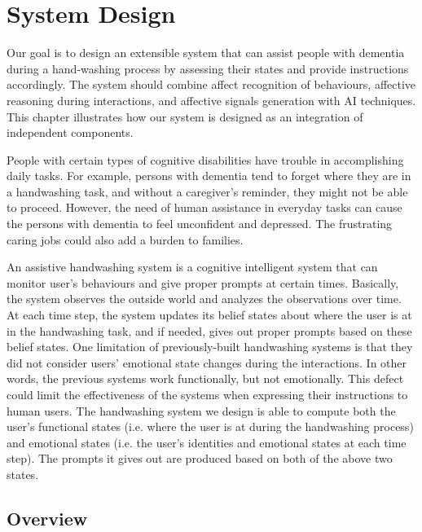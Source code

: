 \chapter{System Design}
\label{chap:design}

Our goal is to design an extensible system that can assist people with dementia during a hand-washing process by assessing their states and provide instructions accordingly. The system should combine affect recognition of behaviours, affective reasoning during interactions, and affective signals generation with AI techniques. This chapter illustrates how our system is designed as an integration of independent components. 

People with certain types of cognitive disabilities have trouble in accomplishing daily tasks. For example, persons with dementia tend to forget where they are in a handwashing task, and without a caregiver's reminder, they might not be able to proceed. However, the need of human assistance in everyday tasks can cause the persons with dementia to feel unconfident and depressed. The frustrating caring jobs could also add a burden to families.

An assistive handwashing system is a cognitive intelligent system that can monitor user's behaviours and give proper prompts at certain times. Basically, the system observes the outside world and analyzes the observations over time. At each time step, the system updates its belief states about where the user is at in the handwashing task, and if needed, gives out proper prompts based on these belief states. One limitation of previously-built handwashing systems is that they did not consider users' emotional state changes during the interactions. In other words, the previous systems work functionally, but not emotionally. This defect could limit the effectiveness of the systems when expressing their instructions to human users. The handwashing system we design is able to compute both the user's functional states (i.e. where the user is at during the handwashing process) and emotional states (i.e. the user's identities and emotional states at each time step). The prompts it gives out are produced based on both of the above two states. 

\section{Overview}

